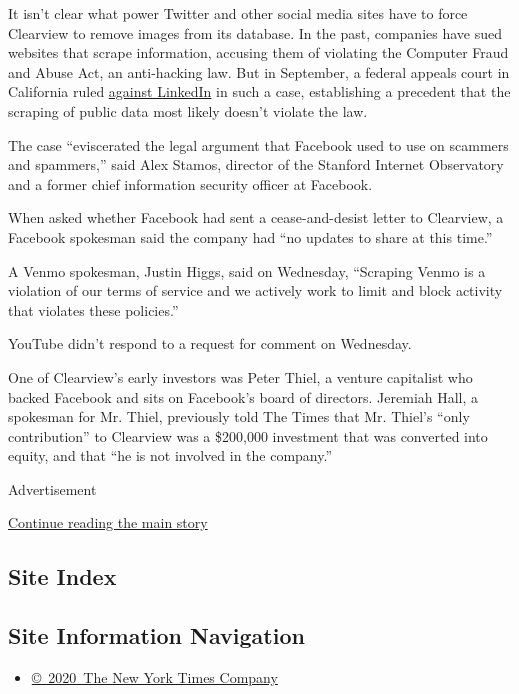 It isn't clear what power Twitter and other social media sites have to
force Clearview to remove images from its database. In the past,
companies have sued websites that scrape information, accusing them of
violating the Computer Fraud and Abuse Act, an anti-hacking law. But in
September, a federal appeals court in California ruled
\href{https://www.eff.org/deeplinks/2019/09/victory-ruling-hiq-v-linkedin-protects-scraping-public-data}{against
LinkedIn} in such a case, establishing a precedent that the scraping of
public data most likely doesn't violate the law.

The case ``eviscerated the legal argument that Facebook used to use on
scammers and spammers,'' said Alex Stamos, director of the Stanford
Internet Observatory and a former chief information security officer at
Facebook.

When asked whether Facebook had sent a cease-and-desist letter to
Clearview, a Facebook spokesman said the company had ``no updates to
share at this time.''

A Venmo spokesman, Justin Higgs, said on Wednesday, ``Scraping Venmo is
a violation of our terms of service and we actively work to limit and
block activity that violates these policies.''

YouTube didn't respond to a request for comment on Wednesday.

One of Clearview's early investors was Peter Thiel, a venture capitalist
who backed Facebook and sits on Facebook's board of directors. Jeremiah
Hall, a spokesman for Mr. Thiel, previously told The Times that Mr.
Thiel's ``only contribution'' to Clearview was a \$200,000 investment
that was converted into equity, and that ``he is not involved in the
company.''

Advertisement

\protect\hyperlink{after-bottom}{Continue reading the main story}

\hypertarget{site-index}{%
\subsection{Site Index}\label{site-index}}

\hypertarget{site-information-navigation}{%
\subsection{Site Information
Navigation}\label{site-information-navigation}}

\begin{itemize}
\tightlist
\item
  \href{https://help.nytimes.com/hc/en-us/articles/115014792127-Copyright-notice}{©~2020~The
  New York Times Company}
\end{itemize}

